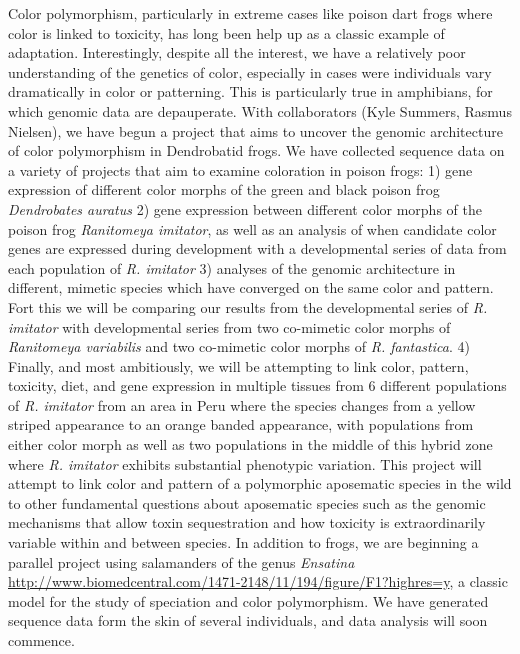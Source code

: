 \documentclass[10.5pt]{article}
\begin{document}
{\noindent
Color polymorphism, particularly in extreme cases like poison dart frogs where color is linked to toxicity, has long been help up as a classic example of adaptation. Interestingly, despite all the interest, we have a relatively poor understanding of the genetics of color, especially in cases were individuals vary dramatically in color or patterning. This is particularly true in amphibians, for which genomic data are depauperate. With collaborators (Kyle Summers, Rasmus Nielsen), we have begun a project that aims to uncover the genomic architecture of color polymorphism in Dendrobatid frogs.  We have collected sequence data on a variety of projects that aim to examine coloration in poison frogs: 1) gene expression of different color morphs of the green and black poison frog \textit{Dendrobates auratus} 2) gene expression between different color morphs of the poison frog \textit{Ranitomeya imitator}, as well as an analysis of when candidate color genes are expressed during development with a developmental series of data from each population of \textit{R. imitator} 3) analyses of the genomic architecture in different, mimetic species which have converged on the same color and pattern. Fort this we will be comparing our results from the developmental series of \textit{R. imitator} with developmental series from two co-mimetic color morphs of \textit{Ranitomeya variabilis} and two co-mimetic color morphs of \textit{R. fantastica}. 4) Finally, and most ambitiously, we will be attempting to link color, pattern, toxicity, diet, and gene expression in multiple tissues from 6 different populations of \textit{R. imitator} from an area in Peru where the species changes from a yellow striped appearance to an orange banded appearance, with populations from either color morph as well as two populations in the middle of this hybrid zone where \textit{R. imitator} exhibits substantial phenotypic variation. This project will attempt to link color and pattern of a polymorphic aposematic species in the wild to other fundamental questions about aposematic species such as the genomic mechanisms that allow toxin sequestration and how toxicity is extraordinarily variable within and between species. In addition to frogs, we are beginning a parallel project using salamanders of the genus \textit{Ensatina} \url{http://www.biomedcentral.com/1471-2148/11/194/figure/F1?highres=y}, a classic model for the study of speciation and color polymorphism.  We have generated sequence data form the skin of several individuals, and data analysis will soon commence.   


}
\end{document}
